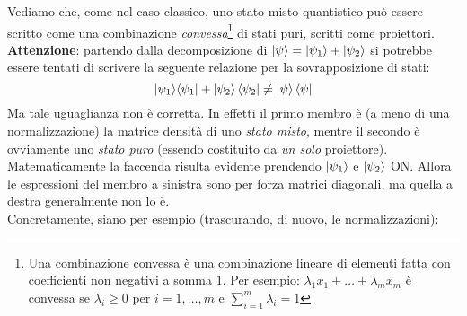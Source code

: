 \documentclass[../../FisicaTeorica.tex]{subfiles}
\begin{document}
Vediamo che, come nel caso classico, uno stato misto quantistico può essere scritto come una combinazione \textit{convessa}\footnote{Una combinazione convessa è una combinazione lineare di elementi fatta con coefficienti non negativi a somma $1$. Per esempio: $\lambda_1 x_1 + \dots +\lambda_m x_m$ è convessa se $\lambda_i \geq 0$ per $i=1,\dots,m$ e $\sum_{i=1}^m \lambda_i = 1$} di stati puri, scritti come proiettori.\\
\textbf{Attenzione}: partendo dalla decomposizione di $\Ket{\psi} = \Ket{\psi_1}+\Ket{\psi_2}$ si potrebbe essere tentati di scrivere la seguente relazione per la sovrapposizione di stati:
\[
|\psi_1\rangle \langle \psi_1|+\left|\psi_2\right\rangle\left\langle\psi_2\right|\neq \Ket{\psi}\Bra{\psi}
\]
Ma tale uguaglianza non è corretta. In effetti il primo membro è (a meno di una normalizzazione) la matrice densità di uno \textit{stato misto}, mentre il secondo è ovviamente uno \textit{stato puro} (essendo costituito da \textit{un solo} proiettore).\\
Matematicamente la faccenda risulta evidente prendendo $\Ket{\psi_1}$ e $\Ket{\psi_2}$ ON. Allora le espressioni del membro a sinistra sono per forza matrici diagonali, ma quella a destra generalmente non lo è.\\
Concretamente, siano per esempio (trascurando, di nuovo, le normalizzazioni):
\end{document}
